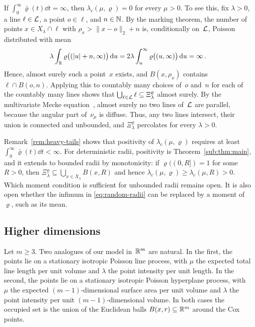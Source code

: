\documentclass[11pt,letterpaper]{article}
\begin{document}
\begin{remark}
\label{rem:heavy-tails}
If $\int_0^\infty\bar\varrho(t)\dd t=\infty$, then $\lambda_c(\mu,\varrho)=0$ for every $\mu>0$. To see this, fix $\lambda>0$, a line $\ell\in\mathcal L$, a point $o\in\ell$, and $n\in\mathbb N$. By the marking theorem, the number of points $x\in X_\lambda\cap\ell$ with $\rho_x>\lVert x-o\rVert_2+n$ is, conditionally on~$\mathcal L$, Poisson distributed with mean
\begin{equation*}
  \lambda\int_\mathbb R\varrho\bigl((\lvert u\rvert+n,\infty)\bigr)\,\mathrm{d} u=2\lambda\int_n^\infty\varrho\bigl((u,\infty)\bigr)\,\mathrm{d} u=\infty\,.
\end{equation*}
Hence, almost surely such a point~$x$ exists, and $B(x,\rho_x)$ contains $\ell\cap B(o,n)$. Applying this to countably many choices of~$o$ and~$n$ for each of the countably many lines shows that $\bigcup_{\ell\in\mathcal L}\ell\subseteq\Xi_\lambda^\varrho$ almost surely. By the multivariate Mecke equation~\cite[Chapter~4]{LP17}, almost surely no two lines of~$\mathcal L$ are parallel, because the angular part of~$\nu_\mu$ is diffuse. Thus, any two lines intersect, their union is connected and unbounded, and $\Xi_\lambda^\varrho$ percolates for every $\lambda>0$.
\end{remark}

Remark~\ref{rem:heavy-tails} shows that positivity of $\lambda_c(\mu,\varrho)$ requires at least $\int_0^\infty\bar\varrho(t)\dd t<\infty$. For deterministic radii, positivity is Theorem~\ref{sub:thm:main}, and it extends to bounded radii by monotonicity: if $\varrho((0,R])=1$ for some $R>0$, then $\Xi_\lambda^\varrho\subseteq\bigcup_{x\in X_\lambda}B(x,R)$ and hence $\lambda_c(\mu,\varrho)\ge\lambda_c(\mu,R)>0$. Which moment condition is sufficient for unbounded radii remains open. It is also open whether the infimum in \eqref{eq:random-radii} can be replaced by a moment of~$\varrho$, such as its mean.

\subsection{Higher dimensions}
\label{sec:higher-dimensions}

Let $m\ge3$. Two analogues of our model in~$\mathbb R^m$ are natural. In the first, the points lie on a stationary isotropic Poisson line process, with $\mu$ the expected total line length per unit volume and $\lambda$ the point intensity per unit length. In the second, the points lie on a stationary isotropic Poisson hyperplane process, with $\mu$ the expected $(m-1)$-dimensional surface area per unit volume and $\lambda$ the point intensity per unit $(m-1)$-dimensional volume. In both cases the occupied set is the union of the Euclidean balls $B(x,r)\subseteq\mathbb R^m$ around the Cox points.
\end{document}
